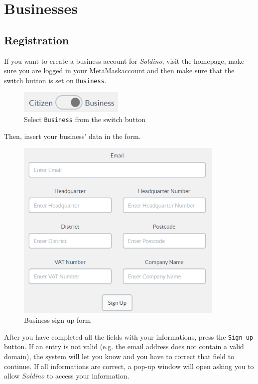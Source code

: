\section{Businesses}
	\subsection{Registration}
	If you want to create a business account for \textit{Soldino}, visit the 
	homepage, make sure you are logged in your MetaMask\glosp account and
	then make sure that the switch button is set on \texttt{Business}.\\
	\begin{figure}[H]
		\includegraphics[width=5cm]{res/images/user_business.png}
		\centering
		\caption{Select \texttt{Business} from the switch button}
	\end{figure}	
	\noindent Then, insert your business' data in the form.
	\begin{figure}[H]
		\includegraphics[width=10cm]{res/images/business_signup.png}
		\centering
		\caption{Business sign up form}
	\end{figure}
	\noindent After you have completed 
	all the	fields with your informations, press the \texttt{Sign up} button. If an 
	entry is not valid (e.g. the email address does not contain a valid 
	domain), the system will let you know and you have to correct that field 
	to continue. If all informations are correct, a pop-up window will open 
	asking you to allow \textit{Soldino} to access your information.\\
